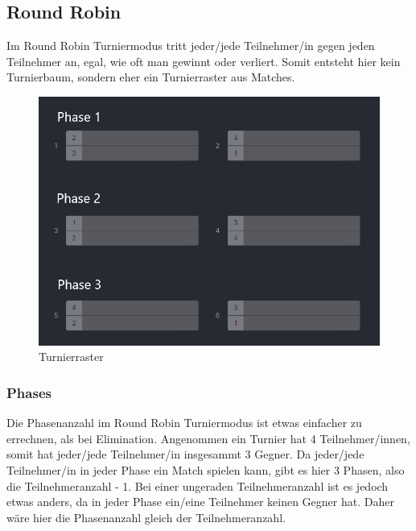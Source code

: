 \subsection{Round Robin}

Im Round Robin Turniermodus tritt jeder/jede Teilnehmer/in gegen jeden Teilnehmer an, egal, wie oft man gewinnt oder verliert. Somit entsteht hier kein Turnierbaum, sondern eher ein Turnierraster aus Matches.

\begin{figure}[H]
    \includegraphics[scale=0.5]{pics/backend/roundrobin/roundrobin_grid.png}
    \caption{Turnierraster\cite{implementation-execution-1}}
\end{figure}

\subsubsection{Phases}

Die Phasenanzahl im Round Robin Turniermodus ist etwas einfacher zu errechnen, als bei Elimination. Angenommen ein Turnier hat 4 Teilnehmer/innen, somit hat jeder/jede Teilnehmer/in insgesammt 3 Gegner. Da jeder/jede Teilnehmer/in in jeder Phase 
ein Match spielen kann, gibt es hier 3 Phasen, also die Teilnehmeranzahl - 1. Bei einer ungeraden Teilnehmeranzahl ist es jedoch etwas anders, da in jeder Phase ein/eine Teilnehmer keinen Gegner hat. Daher wäre hier die Phasenanzahl gleich 
der Teilnehmeranzahl.

